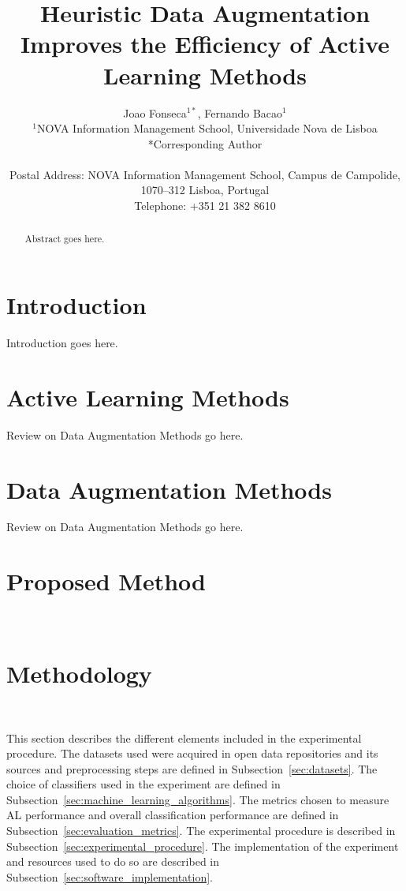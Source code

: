 \documentclass[parskip=full]{scrartcl}
\date{}
\title{%
    Heuristic Data Augmentation Improves the Efficiency of Active Learning
    Methods
}
\author{%
	Joao Fonseca\(^{1*}\), Fernando Bacao\(^{1}\)
	\\
	\small{\(^{1}\)NOVA Information Management School, Universidade Nova de Lisboa}
	\\
	\small{*Corresponding Author}
	\\
	\\
	\small{Postal Address: NOVA Information Management School, Campus de
    Campolide, 1070--312 Lisboa, Portugal}
	\\
	\small{Telephone: +351 21 382 8610}
}
\begin{document}
\maketitle

\begin{abstract}
    Abstract goes here.
\end{abstract}

\section{Introduction}

Introduction goes here.

\section{Active Learning Methods}

Review on Data Augmentation Methods go here.

\section{Data Augmentation Methods}

Review on Data Augmentation Methods go here.


\section{Proposed Method}~\label{sec:proposed_method}

\section{Methodology}~\label{sec:methodology}

This section describes the different elements included in the experimental
procedure. The datasets used were acquired in open data repositories and its
sources and preprocessing steps are defined in Subsection~\ref{sec:datasets}.
The choice of classifiers used in the experiment are defined in
Subsection~\ref{sec:machine_learning_algorithms}. The metrics chosen to
measure AL performance and overall classification performance are defined in
Subsection~\ref{sec:evaluation_metrics}. The experimental procedure is
described in Subsection~\ref{sec:experimental_procedure}. The implementation
of the experiment and resources used to do so are described in
Subsection~\ref{sec:software_implementation}.
\end{document}
